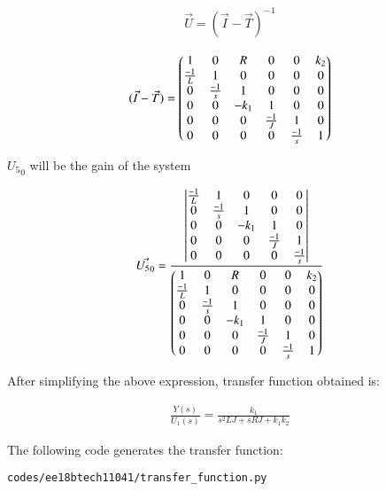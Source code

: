 \begin{enumerate}[label=\thesection.\arabic*.,ref=\thesection.\theenumi]
\begin{align}
    \Vec{U} = {(\Vec{I}-\Vec{T})^-}^1
    \label{eq:ee18btech11041_10}
\end{align}

\begin{align}
    (\Vec{I}-\Vec{T}) = \begin{pmatrix}1 & 0 & R & 0 & 0 & k_2\\
    \frac{-1}{L} & 1 & 0 & 0 & 0 & 0\\
    0 & \frac{-1}{s} & 1 & 0 & 0 & 0\\
    0 & 0 & -k_1 & 1 & 0 & 0\\
    0 & 0 & 0 & \frac{-1}{J} & 1 & 0\\
    0 & 0 & 0 & 0& \frac{-1}{s} & 1 \end{pmatrix}
    \label{eq:ee18btech11041_10}
\end{align}

${U_5}_0$ will be the gain of the system

\begin{align}
    \Vec{{U_5}_0} = \frac{\begin{vmatrix}\frac{-1}{L} & 1 & 0 & 0 & 0 \\
    0 & \frac{-1}{s} & 1 & 0 & 0 \\
    0 & 0 & -k_1 & 1 & 0 \\
    0 & 0 & 0 & \frac{-1}{J} & 1 \\
    0 & 0 & 0 & 0& \frac{-1}{s} \end{vmatrix}}{ \begin{pmatrix}1 & 0 & R & 0 & 0 & k_2\\
    \frac{-1}{L} & 1 & 0 & 0 & 0 & 0\\
    0 & \frac{-1}{s} & 1 & 0 & 0 & 0\\
    0 & 0 & -k_1 & 1 & 0 & 0\\
    0 & 0 & 0 & \frac{-1}{J} & 1 & 0\\
    0 & 0 & 0 & 0& \frac{-1}{s} & 1 \end{pmatrix}}
    \label{eq:ee18btech11041_11}
\end{align}

After simplifying the above expression, transfer function obtained is:

\begin{align}
    \frac{Y(s)}{U_1(s)}=\frac{k_1}{s^2LJ+sRJ+k_1k_2}
    \label{eq:ee18btech11041_12}
\end{align}

The following code generates the transfer function:
\begin{lstlisting}
codes/ee18btech11041/transfer_function.py
\end{lstlisting}



\end{enumerate}
